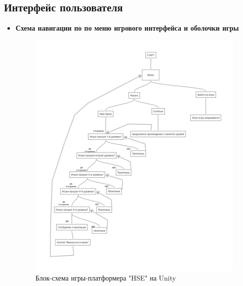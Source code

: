 \documentclass{article}
\begin{document}
\subsection*{Интерфейс пользователя}
\begin{itemize}
    \item \textbf{Схема навигации по по меню игрового интерфейса и оболочки игры} \\
   \begin{figure}[h]
    \centering
    \includegraphics[width=1.0\linewidth]{схема.png}
    \caption{Блок-схема игры-платформера "HSE" на Unity}
    \label{fig:mpr}
    \end{figure}
\end{itemize}
\end{document}
